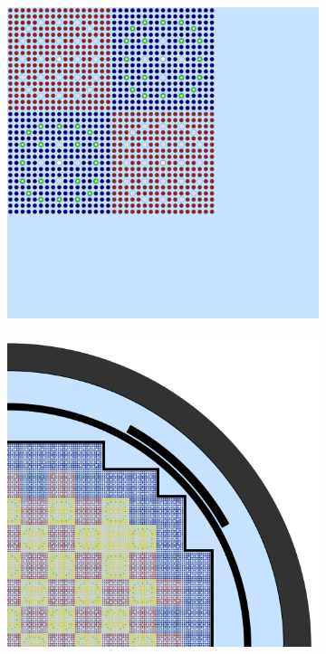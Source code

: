 \documentclass[12pt,twoside]{mitthesis-exec}
\begin{document}
 


\begin{figure}[h!]
\centering
\begin{subfigure}{0.47\textwidth}
  \centering
  \includegraphics[width=0.93\linewidth]{figures/benchmarks/reflector}
  \caption{}
  \label{fig:reflector}
\end{subfigure}%
\begin{subfigure}{0.47\textwidth}
  \centering
  \includegraphics[width=0.93\linewidth]{figures/benchmarks/quarter-core}

\end{subfigure}
\end{figure}
\end{document}
